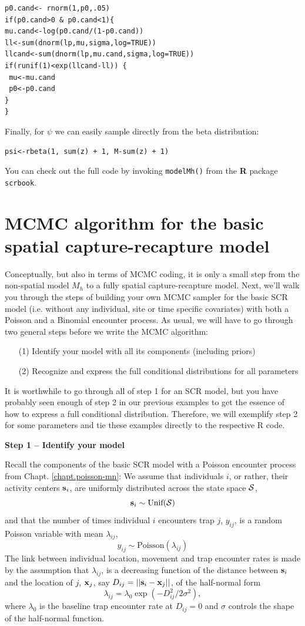 \begin{verbatim}
p0.cand<- rnorm(1,p0,.05)
if(p0.cand>0 & p0.cand<1){
mu.cand<-log(p0.cand/(1-p0.cand))
ll<-sum(dnorm(lp,mu,sigma,log=TRUE))
llcand<-sum(dnorm(lp,mu.cand,sigma,log=TRUE))
if(runif(1)<exp(llcand-ll)) {
 mu<-mu.cand
 p0<-p0.cand
}
}
\end{verbatim}

Finally, for $\psi$ we can easily sample directly from the beta distribution:

\begin{verbatim}
psi<-rbeta(1, sum(z) + 1, M-sum(z) + 1)
\end{verbatim}

You can check out the full code by invoking \mbox{\tt modelMh()} from the {\bf R} package \mbox{\tt scrbook}.

\section{MCMC algorithm for the basic spatial capture-recapture model}

Conceptually, but also in terms of MCMC coding, it is only a small
step from the non-spatial model $M_h$ to a fully spatial
capture-recapture model. Next, we'll walk you through the steps of
building your own MCMC sampler for the basic SCR model (i.e. without
any individual, site or time specific covariates) with both a Poisson
and a Binomial encounter process.  As usual, we will have to go
through two general steps before we write the MCMC algorithm:
\begin{itemize}
\item[  (1)] Identify your model with all its components (including
    priors)
\item[  (2)] Recognize and express the full conditional distributions for
    all parameters
\end{itemize}
It is worthwhile to go through all of step 1 for an SCR model, but you
have probably seen enough of step 2 in our previous examples to get
the essence of how to express a full conditional
distribution. Therefore, we will exemplify step 2 for some parameters
and tie these examples directly to the respective R code.

{\bf Step 1 -- Identify your model}

Recall the components of the basic SCR model with a Poisson encounter process from Chapt. \ref{chapt.poisson-mn}:
We assume that individuals $i$, or rather, their activity centers
${\bf s}_i$, are uniformly distributed across the state space ${\cal S}$,
\[
{\bf s}_i  \sim \mbox{Unif}({\cal S})
\]
and that the number of times individual $i$ encounters trap $j$, $y_{ij}$, is a random Poisson variable with mean $\lambda_{ij}$,
\[
y_{ij} \sim \mbox{Poisson}(\lambda_{ij})
\]
The link between individual location, movement and trap encounter
rates is made by the assumption that $\lambda_{ij}$, is a decreasing
function of the distance between ${\bf s}_i$ and the location of $j$,
${\bf x}_{j}$, say $D_{ij} = ||{\bf s}_{i} - {\bf x}_{j}||$, of the half-normal form
\[
\lambda_{ij} =  \lambda_0  \exp(-D_{ij}^2/2\sigma^2),
\]
where $\lambda_0$ is the baseline trap encounter rate at $D_{ij}=0$ and $\sigma$ controls the shape of the half-normal function.

